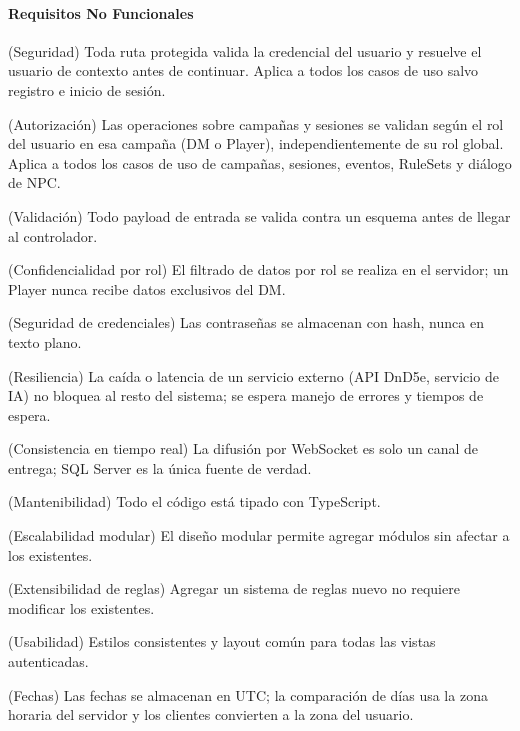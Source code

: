 \paragraph{Requisitos No Funcionales}
\begin{description}[leftmargin=2.2cm,labelwidth=2cm,itemsep=2pt]
\item[RNF-001] (Seguridad) Toda ruta protegida valida la credencial del usuario y resuelve el usuario de contexto antes de continuar. Aplica a todos los casos de uso salvo registro e inicio de sesión.
\item[RNF-002] (Autorización) Las operaciones sobre campañas y sesiones se validan según el rol del usuario en esa campaña (DM o Player), independientemente de su rol global. Aplica a todos los casos de uso de campañas, sesiones, eventos, RuleSets y diálogo de NPC.
\item[RNF-003] (Validación) Todo payload de entrada se valida contra un esquema antes de llegar al controlador.
\item[RNF-004] (Confidencialidad por rol) El filtrado de datos por rol se realiza en el servidor; un Player nunca recibe datos exclusivos del DM.
\item[RNF-005] (Seguridad de credenciales) Las contraseñas se almacenan con hash, nunca en texto plano.
\item[RNF-006] (Resiliencia) La caída o latencia de un servicio externo (API DnD5e, servicio de IA) no bloquea al resto del sistema; se espera manejo de errores y tiempos de espera.
\item[RNF-007] (Consistencia en tiempo real) La difusión por WebSocket es solo un canal de entrega; SQL Server es la única fuente de verdad.
\item[RNF-008] (Mantenibilidad) Todo el código está tipado con TypeScript.
\item[RNF-009] (Escalabilidad modular) El diseño modular permite agregar módulos sin afectar a los existentes.
\item[RNF-010] (Extensibilidad de reglas) Agregar un sistema de reglas nuevo no requiere modificar los existentes.
\item[RNF-011] (Usabilidad) Estilos consistentes y layout común para todas las vistas autenticadas.
\item[RNF-012] (Fechas) Las fechas se almacenan en UTC; la comparación de días usa la zona horaria del servidor y los clientes convierten a la zona del usuario.
\end{description}
